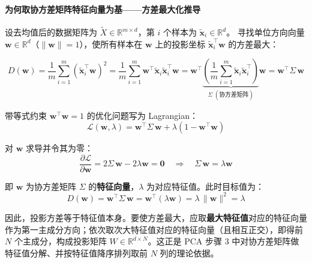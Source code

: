 \documentclass[10.5pt]{config}
\begin{document}
\paragraph{为何取协方差矩阵特征向量为基——方差最大化推导}

设去均值后的数据矩阵为 $\tilde{X}\in\mathbb{R}^{m\times d}$，第 $i$ 个样本为 $\tilde{\mathbf{x}}_i\in\mathbb{R}^d$。
寻找单位方向向量 $\mathbf{w}\in\mathbb{R}^d$（$\|\mathbf{w}\|=1$），使所有样本在 $\mathbf{w}$ 上的投影坐标 $\tilde{\mathbf{x}}_i^\top\mathbf{w}$ 的方差最大：

$$D(\mathbf{w})
= \frac{1}{m}\sum_{i=1}^{m}\!\left(\tilde{\mathbf{x}}_i^\top\mathbf{w}\right)^2
= \frac{1}{m}\sum_{i=1}^{m}\mathbf{w}^\top\tilde{\mathbf{x}}_i\tilde{\mathbf{x}}_i^\top\mathbf{w}
= \mathbf{w}^\top\!\underbrace{\left(\frac{1}{m}\sum_{i=1}^{m}\tilde{\mathbf{x}}_i\tilde{\mathbf{x}}_i^\top\right)}_{\displaystyle\Sigma\;(\text{协方差矩阵})}\!\mathbf{w}
= \mathbf{w}^\top\Sigma\,\mathbf{w}$$

带等式约束 $\mathbf{w}^\top\mathbf{w}=1$ 的优化问题写为 Lagrangian：
$$\mathcal{L}(\mathbf{w},\lambda)=\mathbf{w}^\top\Sigma\,\mathbf{w}+\lambda\left(1-\mathbf{w}^\top\mathbf{w}\right)$$

对 $\mathbf{w}$ 求导并令其为零：
$$\frac{\partial\mathcal{L}}{\partial\mathbf{w}}=2\Sigma\,\mathbf{w}-2\lambda\mathbf{w}=\mathbf{0}
\quad\Longrightarrow\quad
\Sigma\,\mathbf{w}=\lambda\mathbf{w}$$

即 $\mathbf{w}$ 为协方差矩阵 $\Sigma$ 的\textbf{特征向量}，$\lambda$ 为对应特征值。此时目标值为：
$$D(\mathbf{w})=\mathbf{w}^\top\Sigma\,\mathbf{w}=\mathbf{w}^\top(\lambda\mathbf{w})=\lambda\,\|\mathbf{w}\|^2=\lambda$$

因此，投影方差等于特征值本身。要使方差最大，应取\textbf{最大特征值}对应的特征向量作为第一主成分方向；依次取次大特征值对应的特征向量（且相互正交），即得前 $N$ 个主成分，构成投影矩阵 $W\in\mathbb{R}^{d\times N}$。这正是 PCA 步骤 3 中对协方差矩阵做特征值分解、并按特征值降序排列取前 $N$ 列的理论依据。
\end{document}
